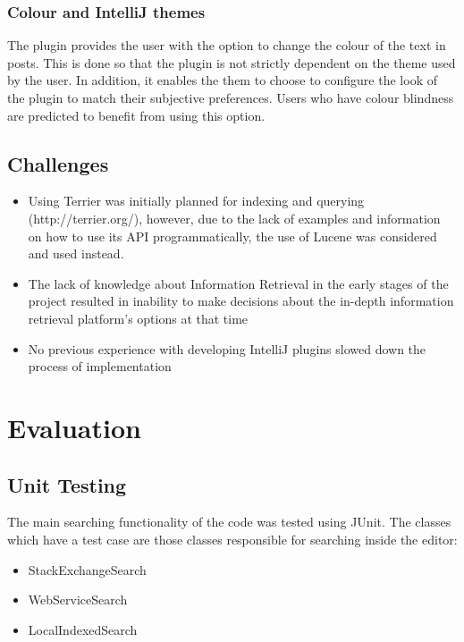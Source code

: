 \documentclass{l4proj}
\begin{document}
\subsection{Colour and IntelliJ themes}
The plugin provides the user with the option to change the colour of the text in posts. This is done so that the plugin is not strictly dependent on the theme used by the user. In addition, it enables the them to choose to configure the look of the plugin to match their subjective preferences. Users who have colour blindness are predicted to benefit from using this option.

\section{Challenges}
\begin{itemize}
\item Using Terrier was initially planned for indexing and querying (http://terrier.org/), however, due to the lack of examples and information on how to use its API programmatically, the use of Lucene was considered and used instead.

\item The lack of knowledge about Information Retrieval in the early stages of the project resulted in inability to make decisions about the in-depth information retrieval platform's options at that time

\item No previous experience with developing IntelliJ plugins slowed down the process of implementation

\end{itemize}

\chapter{Evaluation}

\section{Unit Testing}
The main searching functionality of the code was tested using JUnit. The classes which have a test case are those classes responsible for searching inside the editor:

\begin{itemize}
\item StackExchangeSearch
\item WebServiceSearch
\item LocalIndexedSearch
\end{itemize}
\end{document}
